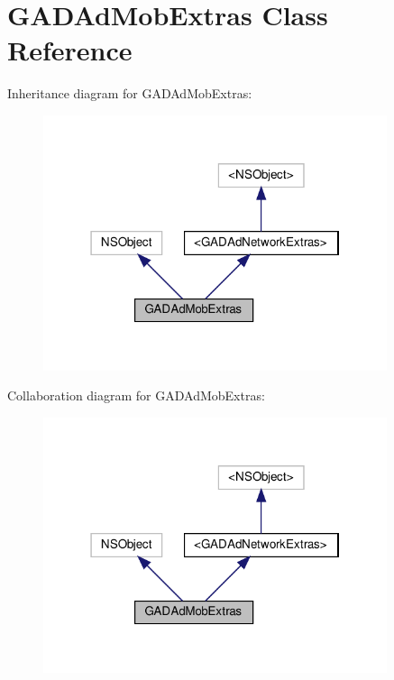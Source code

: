 \hypertarget{interfaceGADAdMobExtras}{}\section{G\+A\+D\+Ad\+Mob\+Extras Class Reference}
\label{interfaceGADAdMobExtras}


Inheritance diagram for G\+A\+D\+Ad\+Mob\+Extras\+:
\nopagebreak
\begin{figure}[H]
\begin{center}
\leavevmode
\includegraphics[width=286pt]{interfaceGADAdMobExtras__inherit__graph}
\end{center}
\end{figure}


Collaboration diagram for G\+A\+D\+Ad\+Mob\+Extras\+:
\nopagebreak
\begin{figure}[H]
\begin{center}
\leavevmode
\includegraphics[width=286pt]{interfaceGADAdMobExtras__coll__graph}
\end{center}
\end{figure}
